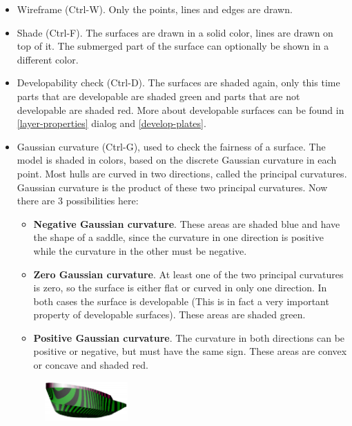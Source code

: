 \documentclass[12pt]{article}
\begin{document}
\begin{itemize}

  \item Wireframe (Ctrl-W). Only the points, lines and edges are drawn.

  \item Shade (Ctrl-F). The surfaces are drawn in a solid color, lines
are drawn on top of it. The submerged part of the surface can
optionally be shown in a different color.

  \item Developability check (Ctrl-D). The surfaces are shaded again,
only this time parts that are developable are shaded green and parts
that are not developable are shaded red. More about developable
surfaces can be found in \ref{layer-properties} dialog
and \ref{develop-plates}.

  \item Gaussian curvature (Ctrl-G), used to check the fairness of a
surface. The model is shaded in colors, based on the discrete Gaussian
curvature in each point. Most hulls are curved in two directions,
called the principal curvatures.  Gaussian curvature is the product of
these two principal curvatures. Now there are 3 possibilities here:

  \begin{itemize}

    \item \textbf{Negative Gaussian curvature}. These areas are shaded blue and
have the shape of a saddle, since the curvature in one direction is
positive while the curvature in the other must be negative.

    \item \textbf{Zero Gaussian curvature}. At least one of the two principal
curvatures is zero, so the surface is either flat or curved in only
one direction. In both cases the surface is developable (This is in
fact a very important property of developable surfaces). These areas
are shaded green.

    \item \textbf{Positive Gaussian curvature}. The curvature in both
directions can be positive or negative, but must have the same
sign. These areas are convex or concave and shaded red.

  \end{itemize}

\begin{figure}
        \centering
        \includegraphics[width=0.3\textwidth,natwidth=493,natheight=233]{zebrashading.png}
        \caption{}
        \label{fig:zebra}
\end{figure}


\end{itemize}
\end{document}
